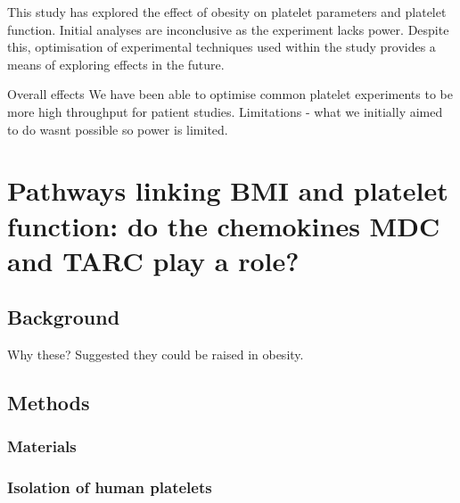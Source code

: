 \documentclass[11pt,twoside]{bristolthesis}
\begin{document}
This study has explored the effect of obesity on platelet parameters and platelet function. Initial analyses are inconclusive as the experiment lacks power. Despite this, optimisation of experimental techniques used within the study provides a means of exploring effects in the future.

Overall effects
We have been able to optimise common platelet experiments to be more high throughput for patient studies.
Limitations - what we initially aimed to do wasnt possible so power is limited.

\hypertarget{pathways-linking-bmi-and-platelet-function-do-the-chemokines-mdc-and-tarc-play-a-role}{%
\chapter{Pathways linking BMI and platelet function: do the chemokines MDC and TARC play a role?}\label{pathways-linking-bmi-and-platelet-function-do-the-chemokines-mdc-and-tarc-play-a-role}}

\hypertarget{background-4}{%
\section{Background}\label{background-4}}

Why these? Suggested they could be raised in obesity.

\hypertarget{methods-2}{%
\section{Methods}\label{methods-2}}

\hypertarget{materials-1}{%
\subsection{Materials}\label{materials-1}}

\hypertarget{isolation-of-human-platelets}{%
\subsection{Isolation of human platelets}\label{isolation-of-human-platelets}}
\end{document}
